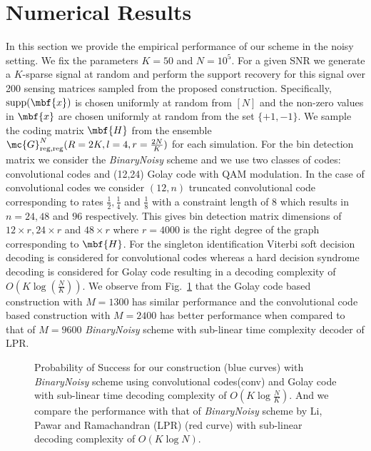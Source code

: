 \documentclass[conference]{IEEEtran}
\newcommand*{\MyPath}{../}
\begin{document}
\section{Numerical Results}
In this section we provide the empirical performance of our scheme in the noisy setting. We fix the parameters $K=50$ and $N=10^5$. For a given SNR we generate a $K$-sparse signal at random and perform the support recovery for this signal over 200 sensing matrices sampled from the proposed construction. Specifically, $\text{supp}(\mbf{x})$ is chosen uniformly at random from $[N]$ and the non-zero values in $\mbf{x}$ are chosen uniformly at random from the set $\{+1,-1\}$. We sample the coding matrix $\mbf{H}$ from the ensemble $\mc{G}_{\text{reg,reg}}^{N}(R=2K,l=4,r=\frac{2N}{K})$ for each simulation. For the bin detection matrix we consider the \emph{BinaryNoisy} scheme and we use two classes of codes: convolutional codes and (12,24) Golay code with QAM modulation. In the case of convolutional codes we consider $(12,n)$ truncated convolutional code corresponding to rates $\frac{1}{2},\frac{1}{4}$ and $\frac{1}{8}$ with a constraint length of $8$ which results in $n=24,48$ and $96$ respectively. This gives bin detection matrix dimensions of $12\times r, 24\times r$ and $48\times r$ where $r=4000$ is the right degree of the graph corresponding to $\mbf{H}$. For the singleton identification Viterbi soft decision decoding is considered for convolutional codes whereas a hard decision syndrome decoding is considered for Golay code resulting in a decoding complexity of $O\left(K\log\left(\frac{N}{K}\right)\right)$. We observe from Fig.~\ref{Fig:Sims} that the Golay code based construction with $M=1300$ has similar performance and the convolutional code based construction with $M=2400$ has better performance when compared to that of  $M=9600$ \emph{BinaryNoisy} scheme with sub-linear time complexity decoder of LPR\cite{li2015subisit}. %

\begin{figure}
\resizebox{0.5\textwidth}{!}{
\begin{centering}

\end{centering}
}
\caption{Probability of Success for our construction (blue curves) with \emph{BinaryNoisy} scheme using convolutional codes(conv) and Golay code with sub-linear time decoding complexity of $O(K\log \frac{N}{K})$.%
 And we compare the performance with that of \emph{BinaryNoisy} scheme by Li, Pawar and Ramachandran (LPR) (red curve) \cite{li2015subdraft} with sub-linear decoding complexity of $O\left( K \log N\right)$.} %

\label{Fig:Sims}	
\end{figure}
\end{document}
